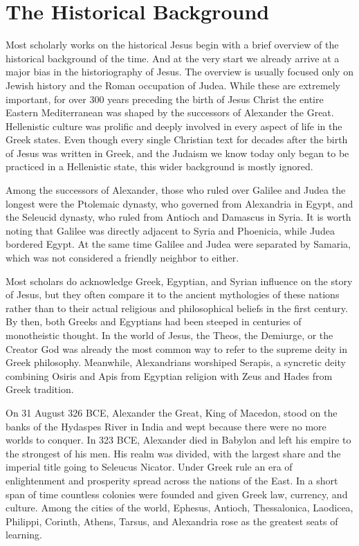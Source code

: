 \section{The Historical Background}\label{par:background-historical}

Most scholarly works on the historical Jesus begin with a brief overview of the historical background of the time.
And at the very start we already arrive at a major bias in the historiography of Jesus.
The overview is usually focused only on Jewish history and the Roman occupation of Judea.
While these are extremely important, for over 300 years preceding the birth of Jesus Christ the entire Eastern Mediterranean was shaped by the successors of Alexander the Great.
Hellenistic culture was prolific and deeply involved in every aspect of life in the Greek states.
Even though every single Christian text for decades after the birth of Jesus was written in Greek, and the Judaism we know today only began to be practiced in a Hellenistic state, this wider background is mostly ignored.

Among the successors of Alexander, those who ruled over Galilee and Judea the longest were the Ptolemaic dynasty, who governed from Alexandria in Egypt, and the Seleucid dynasty, who ruled from Antioch and Damascus in Syria.
It is worth noting that Galilee was directly adjacent to Syria and Phoenicia, while Judea bordered Egypt.
At the same time Galilee and Judea were separated by Samaria, which was not considered a friendly neighbor to either.

Most scholars do acknowledge Greek, Egyptian, and Syrian influence on the story of Jesus, but they often compare it to the ancient mythologies of these nations rather than to their actual religious and philosophical beliefs in the first century.
By then, both Greeks and Egyptians had been steeped in centuries of monotheistic thought.
In the world of Jesus, the Theos, the Demiurge, or the Creator God was already the most common way to refer to the supreme deity in Greek philosophy.
Meanwhile, Alexandrians worshiped Serapis, a syncretic deity combining Osiris and Apis from Egyptian religion with Zeus and Hades from Greek tradition.

On 31 August 326 BCE, Alexander the Great, King of Macedon, stood on the banks of the Hydaspes River in India and wept because there were no more worlds to conquer.
In 323 BCE, Alexander died in Babylon and left his empire to the strongest of his men.
His realm was divided, with the largest share and the imperial title going to Seleucus Nicator.
Under Greek rule an era of enlightenment and prosperity spread across the nations of the East.
In a short span of time countless colonies were founded and given Greek law, currency, and culture.
Among the cities of the world, Ephesus, Antioch, Thessalonica, Laodicea, Philippi, Corinth, Athens, Tarsus, and Alexandria rose as the greatest seats of learning.


